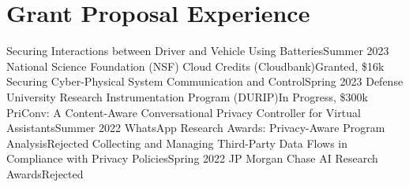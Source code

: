 \section{Grant Proposal Experience}
  \CVSubHeadingListStart
    \CVSubheading
      {Securing Interactions between Driver and Vehicle Using Batteries}{Summer 2023}
      {National Science Foundation (NSF) Cloud Credits (Cloudbank)}{Granted, \$16k}
    \CVSubheading
      {Securing Cyber-Physical System Communication and Control}{Spring 2023}
      {Defense University Research Instrumentation Program (DURIP)}{In Progress, \$300k}
    \CVSubheading
      {PriConv: A Content-Aware Conversational Privacy Controller for Virtual Assistants}{Summer 2022}
      {WhatsApp Research Awards: Privacy-Aware Program Analysis}{Rejected}
    \CVSubheading
      {Collecting and Managing Third-Party Data Flows in Compliance with Privacy Policies}{Spring 2022}
      {JP Morgan Chase AI Research Awards}{Rejected}
  \CVSubHeadingListEnd